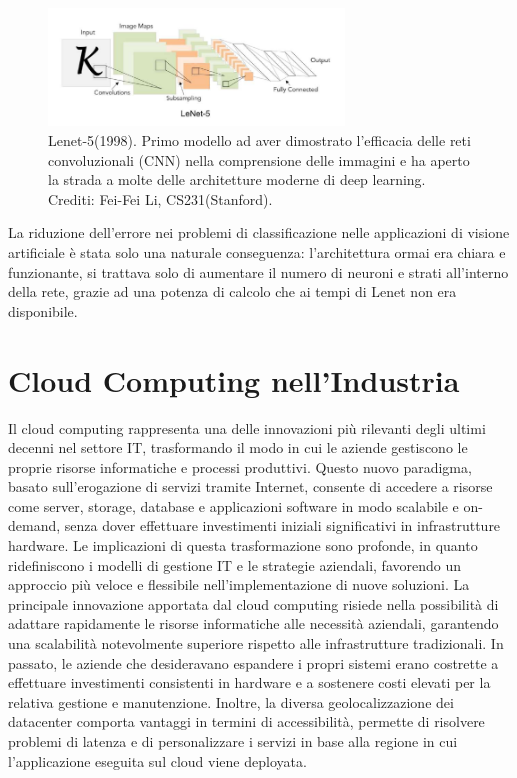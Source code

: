 \begin{figure}[htbp]
    \centering
    \includegraphics[width=0.7\textwidth]{figures/Lenet.png}
    \caption{Lenet-5(1998). Primo modello ad aver dimostrato l'efficacia delle reti convoluzionali (CNN) nella comprensione delle immagini e ha aperto la strada a molte delle architetture moderne di deep learning. Crediti: Fei-Fei Li, CS231(Stanford).}
    \label{fig:Lenet-5}
\end{figure}

\noindent La riduzione dell'errore nei problemi di classificazione nelle applicazioni di visione artificiale è stata solo una naturale conseguenza: l'architettura ormai era chiara e funzionante, si trattava solo di aumentare il numero di neuroni e strati all'interno della rete, grazie ad una potenza di calcolo che ai tempi di Lenet non era disponibile.  
   

\section{Cloud Computing nell'Industria}

Il cloud computing rappresenta una delle innovazioni più rilevanti degli ultimi decenni nel settore IT, trasformando il modo in cui le aziende gestiscono le proprie risorse informatiche e processi produttivi. Questo nuovo paradigma, basato sull’erogazione di servizi tramite Internet, consente di accedere a risorse come server, storage, database e applicazioni software in modo scalabile e on-demand, senza dover effettuare investimenti iniziali significativi in infrastrutture hardware. Le implicazioni di questa trasformazione sono profonde, in quanto ridefiniscono i modelli di gestione IT e le strategie aziendali, favorendo un approccio più veloce e flessibile nell’implementazione di nuove soluzioni. La principale innovazione apportata dal cloud computing risiede nella possibilità di adattare rapidamente le risorse informatiche alle necessità aziendali, garantendo una scalabilità notevolmente superiore rispetto alle infrastrutture tradizionali. In passato, le aziende che desideravano espandere i propri sistemi erano costrette a effettuare investimenti consistenti in hardware e a sostenere costi elevati per la relativa gestione e manutenzione. Inoltre, la diversa geolocalizzazione dei datacenter comporta vantaggi in termini di accessibilità, permette di risolvere problemi di latenza e di personalizzare i servizi in base alla regione in cui l'applicazione eseguita sul cloud viene deployata. 


